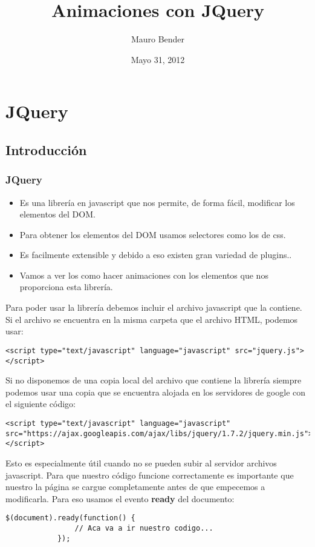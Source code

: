 \documentclass[10pt]{beamer}
\title[Javascript - JQuery (Parte 2)]{Animaciones con JQuery}
\author{Mauro Bender}
\date{Mayo 31, 2012}
\begin{document}
\begin{frame}
\titlepage
\end{frame}

\section{JQuery}
\subsection{Introducción}
\begin{frame}[fragile]
  \frametitle{JQuery}
  \begin{itemize}
    \pause \item Es una librería en javascript que nos permite, de forma fácil, modificar los elementos del DOM.
    \pause \item Para obtener los elementos del DOM usamos selectores como los de css.
    \pause \item Es facilmente extensible y debido a eso existen gran variedad de plugins..
    \pause \item Vamos a ver los como hacer animaciones con los elementos que nos proporciona esta librería.
  \end{itemize}
\end{frame}

\begin{frame}[fragile]
	\pause Para poder usar la librería debemos incluir el archivo javascript que la contiene. Si el archivo 
			 se encuentra en la misma carpeta que el archivo HTML, podemos usar:
	\pause \begin{lstlisting}[html]
			<script type="text/javascript" language="javascript" src="jquery.js"></script>
		\end{lstlisting}
	\pause Si no disponemos de una copia local del archivo que contiene la librería siempre podemos usar una
			 copia que se encuentra alojada en los servidores de google con el siguiente código:
	\pause \begin{lstlisting}[html]
			<script type="text/javascript" language="javascript" src="https://ajax.googleapis.com/ajax/libs/jquery/1.7.2/jquery.min.js"></script>
		\end{lstlisting}
	\pause Esto es especialmente útil cuando no se pueden subir al servidor archivos javascript.
	\pause Para que nuestro código funcione correctamente es importante que nuestro la página se cargue completamente antes
			 de que empecemos a modificarla. Para eso usamos el evento \textbf{ready} del documento:
	\pause \begin{lstlisting}[html]
			$(document).ready(function() {
				// Aca va a ir nuestro codigo...
			});
		\end{lstlisting}
\end{frame}
\end{document}
